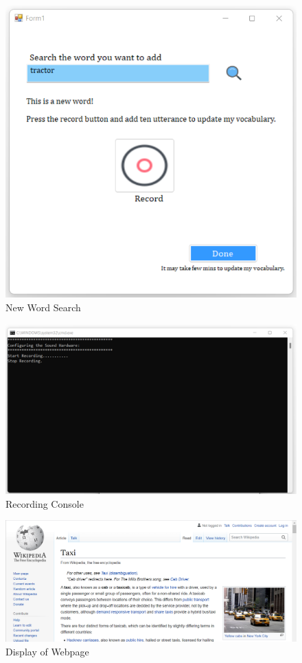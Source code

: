 \documentclass{article}
\begin{document}
\begin{figure}
\includegraphics[scale=1.0]{newWord.png}
\caption{New Word Search}
\label{fig:searchNew}
\end{figure}
\begin{figure}
\includegraphics[scale=0.7]{console.png}
\caption{Recording Console}
\label{fig:rc}
\end{figure}
\begin{figure}
\includegraphics[scale=0.6]{wiki.png}
\caption{Display of Webpage}
\label{fig:wp}
\end{figure}
\end{document}
